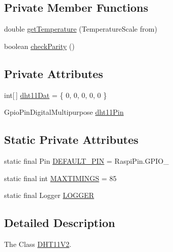 \subsection*{Private Member Functions}
\begin{DoxyCompactItemize}
\item 
double \hyperlink{classcom_1_1libsensorj_1_1concretesensor_1_1DHT11V2_a4efa0044c366379af59e24b9570b3ddf}{get\+Temperature} (Temperature\+Scale from)
\item 
boolean \hyperlink{classcom_1_1libsensorj_1_1concretesensor_1_1DHT11V2_a250ebf2e29c3e9c84c840d6f6afc1c00}{check\+Parity} ()
\end{DoxyCompactItemize}
\subsection*{Private Attributes}
\begin{DoxyCompactItemize}
\item 
int\mbox{[}$\,$\mbox{]} \hyperlink{classcom_1_1libsensorj_1_1concretesensor_1_1DHT11V2_a450dd7dfb4fdc23cd25523ad22890ee4}{dht11\+Dat} = \{ 0, 0, 0, 0, 0 \}
\item 
Gpio\+Pin\+Digital\+Multipurpose \hyperlink{classcom_1_1libsensorj_1_1concretesensor_1_1DHT11V2_a04cca3ab141bcf0089fd6a7338a5dabe}{dht11\+Pin}
\end{DoxyCompactItemize}
\subsection*{Static Private Attributes}
\begin{DoxyCompactItemize}
\item 
static final Pin \hyperlink{classcom_1_1libsensorj_1_1concretesensor_1_1DHT11V2_a10e251a19e426166bb913323eee6243b}{D\+E\+F\+A\+U\+L\+T\+\_\+\+P\+I\+N} = Raspi\+Pin.\+G\+P\+I\+O\+\_
\item 
static final int \hyperlink{classcom_1_1libsensorj_1_1concretesensor_1_1DHT11V2_ad64749b474c180fea185aecd512eb656}{M\+A\+X\+T\+I\+M\+I\+N\+G\+S} = 85
\item 
static final Logger \hyperlink{classcom_1_1libsensorj_1_1concretesensor_1_1DHT11V2_acef19b315279adf9b39a4407487d401e}{L\+O\+G\+G\+E\+R}
\end{DoxyCompactItemize}


\subsection{Detailed Description}
The Class \hyperlink{classcom_1_1libsensorj_1_1concretesensor_1_1DHT11V2}{D\+H\+T11\+V2}. 

